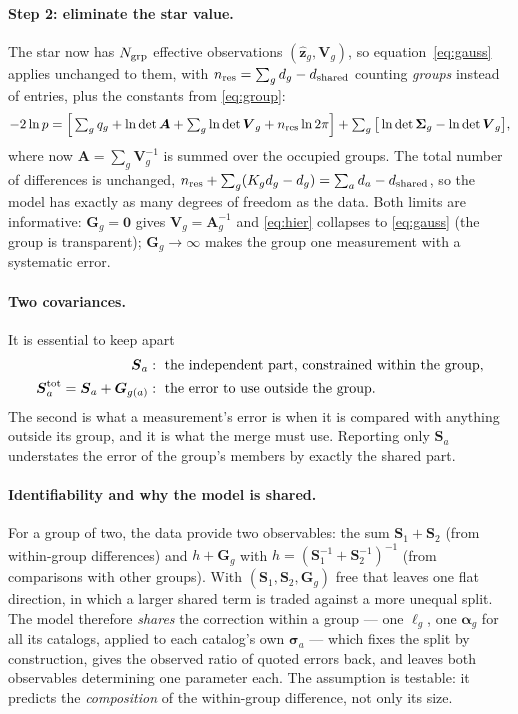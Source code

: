\documentclass[11pt,a4paper]{article}
\newcommand{\bv}[1]{\boldsymbol{#1}}          %
\newcommand{\bM}[1]{\boldsymbol{#1}}          %
\newcommand{\lndet}{\ln\det}
\begin{document}
\paragraph{Step 2: eliminate the star value.} The star now has $N_{\rm grp}$
effective observations $(\hat{\bv z}_g,\bM V_g)$, so equation~\eqref{eq:gauss}
applies unchanged to them, with $n_{\rm res}=\sum_g d_g-d_{\rm shared}$ counting
\emph{groups} instead of entries, plus the constants from \eqref{eq:group}:
\begin{equation}
  -2\ln p = \Big[\textstyle\sum_g q_g + \lndet\bM A + \sum_g \lndet\bM V_g + n_{\rm res}\ln 2\pi\Big]
  + \sum_g\big[\lndet\bM\Sigma_g - \lndet\bM V_g\big] ,
  \label{eq:hier}
\end{equation}
where now $\bM A = \sum_g \bM V_g^{-1}$ is summed over the occupied groups.
The total number of differences is unchanged,
$n_{\rm res}+\sum_g(K_gd_g-d_g)=\sum_a d_a-d_{\rm shared}$, so the model has exactly
as many degrees of freedom as the data. Both limits are informative:
$\bM G_g=\bM 0$ gives $\bM V_g=\bM A_g^{-1}$ and \eqref{eq:hier} collapses to
\eqref{eq:gauss} (the group is transparent); $\bM G_g\to\infty$ makes the group
one measurement with a systematic error.

\paragraph{Two covariances.} It is essential to keep apart
\begin{align}
  \bM S_a &:\ \text{the independent part, constrained within the group}, \\
  \bM S_a^{\rm tot} = \bM S_a + \bM G_{g(a)} &:\ \text{the error to use outside the group}.
\end{align}
The second is what a measurement's error is when it is compared with anything
outside its group, and it is what the merge must use. Reporting only $\bM S_a$
understates the error of the group's members by exactly the shared part.

\paragraph{Identifiability and why the model is shared.} For a group of two, the
data provide two observables: the sum $\bM S_1+\bM S_2$ (from within-group
differences) and $h+\bM G_g$ with $h=(\bM S_1^{-1}+\bM S_2^{-1})^{-1}$ (from
comparisons with other groups). With $(\bM S_1,\bM S_2,\bM G_g)$ free that leaves
one flat direction, in which a larger shared term is traded against a more
unequal split. The model therefore \emph{shares} the correction within a group
--- one $\bv\ell_g$, one $\bv\alpha_g$ for all its catalogs, applied to each
catalog's own $\bv\sigma_a$ --- which fixes the split by construction, gives the
observed ratio of quoted errors back, and leaves both observables determining one
parameter each. The assumption is testable: it predicts the \emph{composition} of
the within-group difference, not only its size.
\end{document}
